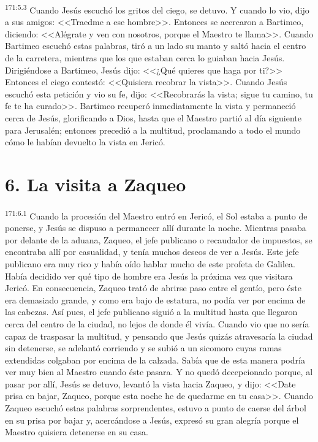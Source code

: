 \par 
\textsuperscript{171:5.3} Cuando Jesús escuchó los gritos del ciego, se detuvo. Y cuando lo vio, dijo a sus amigos: <<Traedme a ese hombre>>. Entonces se acercaron a Bartimeo, diciendo: <<Alégrate y ven con nosotros, porque el Maestro te llama>>. Cuando Bartimeo escuchó estas palabras, tiró a un lado su manto y saltó hacia el centro de la carretera, mientras que los que estaban cerca lo guiaban hacia Jesús. Dirigiéndose a Bartimeo, Jesús dijo: <<¿Qué quieres que haga por ti?>> Entonces el ciego contestó: <<Quisiera recobrar la vista>>. Cuando Jesús escuchó esta petición y vio su fe, dijo: <<Recobrarás la vista; sigue tu camino, tu fe te ha curado>>. Bartimeo recuperó inmediatamente la vista y permaneció cerca de Jesús, glorificando a Dios, hasta que el Maestro partió al día siguiente para Jerusalén; entonces precedió a la multitud, proclamando a todo el mundo cómo le habían devuelto la vista en Jericó.

\section*{6. La visita a Zaqueo}
\par 
\textsuperscript{171:6.1} Cuando la procesión del Maestro entró en Jericó, el Sol estaba a punto de ponerse, y Jesús se dispuso a permanecer allí durante la noche. Mientras pasaba por delante de la aduana, Zaqueo, el jefe publicano o recaudador de impuestos, se encontraba allí por casualidad, y tenía muchos deseos de ver a Jesús. Este jefe publicano era muy rico y había oído hablar mucho de este profeta de Galilea. Había decidido ver qué tipo de hombre era Jesús la próxima vez que visitara Jericó. En consecuencia, Zaqueo trató de abrirse paso entre el gentío, pero éste era demasiado grande, y como era bajo de estatura, no podía ver por encima de las cabezas. Así pues, el jefe publicano siguió a la multitud hasta que llegaron cerca del centro de la ciudad, no lejos de donde él vivía. Cuando vio que no sería capaz de traspasar la multitud, y pensando que Jesús quizás atravesaría la ciudad sin detenerse, se adelantó corriendo y se subió a un sicomoro cuyas ramas extendidas colgaban por encima de la calzada. Sabía que de esta manera podría ver muy bien al Maestro cuando éste pasara. Y no quedó decepcionado porque, al pasar por allí, Jesús se detuvo, levantó la vista hacia Zaqueo, y dijo: <<Date prisa en bajar, Zaqueo, porque esta noche he de quedarme en tu casa>>. Cuando Zaqueo escuchó estas palabras sorprendentes, estuvo a punto de caerse del árbol en su prisa por bajar y, acercándose a Jesús, expresó su gran alegría porque el Maestro quisiera detenerse en su casa.

